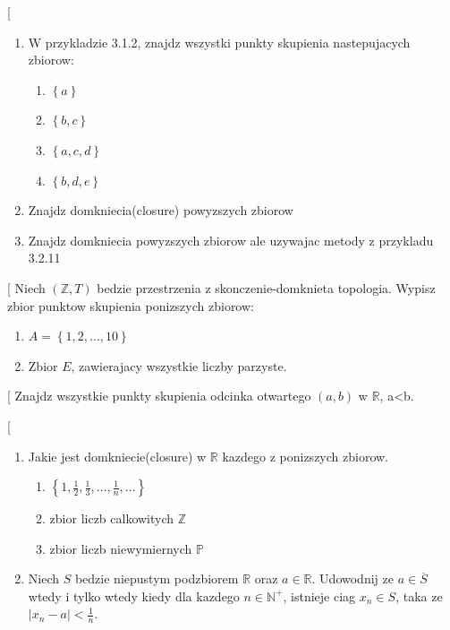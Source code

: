 \documentclass{article}
\makeatletter
\def\myitem{%
   \@ifnextchar[ \@myitem{\@noitemargtrue\@myitem[\@itemlabel]}}
\def\@myitem[#1]{\item[#1]\mbox{}\\}
\makeatother
\begin{document}
\begin{enumerate}[align=left] %
        \renewcommand{\labelenumi}{\textbf{Cwiczenie 3.1.\arabic{enumi}}}

        \myitem 
        \begin{enumerate}
            \item W przykladzie 3.1.2, znajdz wszystki punkty skupienia nastepujacych zbiorow:
                \begin{enumerate}
                    \item $\left\{ a \right\}$
                    \item $\left\{ b,c \right\}$
                    \item $\left\{ a,c,d \right\}$
                    \item $\left\{ b,d,e \right\}$
                \end{enumerate}
            \item Znajdz domkniecia(closure) powyzszych zbiorow
            \item Znajdz domkniecia powyzszych zbiorow ale uzywajac metody z przykladu 3.2.11
        \end{enumerate}
        \myitem Niech $(\mathbb{Z}, T)$ bedzie przestrzenia z skonczenie-domknieta topologia. Wypisz zbior punktow skupienia ponizszych zbiorow:
        \begin{enumerate}
            \item $A = \left\{1,2,\dots,10  \right\}$
            \item Zbior $E$, zawierajacy wszystkie liczby parzyste.
        \end{enumerate}

        \myitem Znajdz wszystkie punkty skupienia odcinka otwartego $(a,b)$ w $\mathbb{R}$, a<b.

        \myitem 
        \begin{enumerate}
            \item Jakie jest domkniecie(closure) w $\mathbb{R}$ kazdego z ponizszych zbiorow.
                \begin{enumerate}
                    \item $\left\{ 1, \frac{1}{2}, \frac{1}{3}, \dots, \frac{1}{n} , \dots \right\}$
                    \item zbior liczb calkowitych $\mathbb{Z}$
                    \item zbior liczb niewymiernych $\mathbb{P}$
                \end{enumerate}
            \item Niech $S$ bedzie niepustym podzbiorem $\mathbb{R}$ oraz $a \in \mathbb{R}$. Udowodnij ze $a \in \overline{S}$ wtedy i tylko wtedy kiedy dla kazdego $n \in \mathbb{N}^{+}$, istnieje ciag $x_{n} \in S$, taka ze $|x_{n}-a| < \frac{1}{n}$.  
        \end{enumerate}


\end{enumerate}
\end{document}
